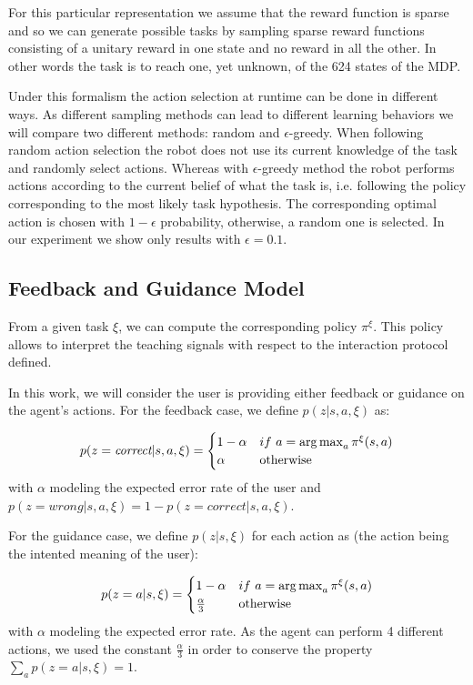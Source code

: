 For this particular representation we assume that the reward function is sparse and so we can generate possible tasks by sampling sparse reward functions consisting of a unitary reward in one state and no reward in all the other. In other words the task is to reach one, yet unknown, of the 624 states of the MDP.

Under this formalism the action selection at runtime can be done in different ways. As different sampling methods can lead to different learning behaviors we will compare two different methods: random and  $\epsilon$-greedy. When following random action selection the robot does not use its current knowledge of the task and randomly select actions. Whereas with $\epsilon$-greedy method the robot performs actions according to the current belief of what the task is, i.e. following the policy corresponding to the most likely task hypothesis. The corresponding optimal action is chosen with $1-\epsilon$ probability, otherwise, a random one is selected. In our experiment we show only results with $\epsilon =  0.1$. 

\subsection{Feedback and Guidance Model}

From a given task $\xi$, we can compute the corresponding policy $\pi^{\xi}$. This policy allows to interpret the teaching signals with respect to the interaction protocol defined. 

In this work, we will consider the user is providing either feedback or guidance on the agent's actions. For the feedback case, we define $p(z |s, a, \xi)$ as:

\begin{equation*}
    p(z = \emph{correct} |s,a,\xi) = 
    \begin{cases}
    1-\alpha               & if~a = \argmax_a \pi^{\xi}(s,a)\\
        \alpha             & \text{otherwise}\\
   \end{cases}
\end{equation*}
with $\alpha$ modeling the expected error rate of the user and $p(z = wrong |s,a,\xi) = 1 - p(z = correct |s,a,\xi)$.

For the guidance case, we define $p(z |s, \xi)$ for each action as (the action being the intented meaning of the user):

\begin{equation*}
    p(z = a |s,\xi) = 
    \begin{cases}
        1-\alpha              & if~a = \argmax_a \pi^{\xi}(s,a)\\
        \frac{\alpha}{3}             & \text{otherwise}\\
   \end{cases}
\end{equation*}
with $\alpha$ modeling the expected error rate. As the agent can perform 4 different actions, we used the constant $\frac{\alpha}{3}$ in order to conserve the property $\sum_a p(z = a |s,\xi) = 1$.

